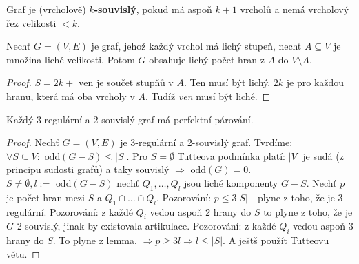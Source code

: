 \begin{definice}
	Graf je (vrcholově) \textbf{$k$-souvislý}, pokud má aspoň $k+1$ vrcholů a nemá vrcholový řez velikosti $< k$.
\end{definice}

\begin{lemma}
	Nechť $G = (V,E)$ je graf, jehož každý vrchol má lichý stupeň, nechť $A \subseteq V$ je množina liché velikosti. Potom $G$ obsahuje lichý počet hran z $A$ do $V \setminus A$.
\end{lemma}

\begin{proof}
	$S = 2k + \text{ ven}$ je součet stupňů v $A$. Ten musí být lichý. $2k$ je pro každou hranu, která má oba vrcholy v $A$. Tudíž \textit{ven} musí být liché.
\end{proof}

\begin{veta}[Petersen]
	Každý 3-regulární a 2-souvislý graf má perfektní párování.
\end{veta}

\begin{proof}
	Nechť $G = (V,E)$ je 3-regulární a 2-souvislý graf. Tvrdíme: $\forall S \subseteq V: \text{ odd}(G-S) \leq |S|$. Pro $S = \emptyset$ Tutteova podmínka platí: $|V|$ je sudá (z principu sudosti grafů) a taky souvislý $\Rightarrow \text{ odd}(G)=0$. $S \neq \emptyset, l := \text{ odd}(G-S)$ nechť $Q_{1},\dots,Q_{l}$ jsou liché komponenty $G-S$. Nechť $p$ je počet hran mezi $S$ a $Q_{1} \cap \dots \cap Q_{l}$. Pozorování: $p \leq 3|S|$ - plyne z toho, že je 3-regulární. Pozorování: z každé $Q_{i}$ vedou aspoň 2 hrany do $S$ to plyne z toho, že je $G$ 2-souvislý, jinak by existovala artikulace. Pozorování: z každé $Q_{i}$ vedou aspoň 3 hrany do $S$. To plyne z lemma. $\Rightarrow p \geq 3l \Rightarrow l \leq |S|$. A ještš použít Tutteovu větu.
\end{proof}
